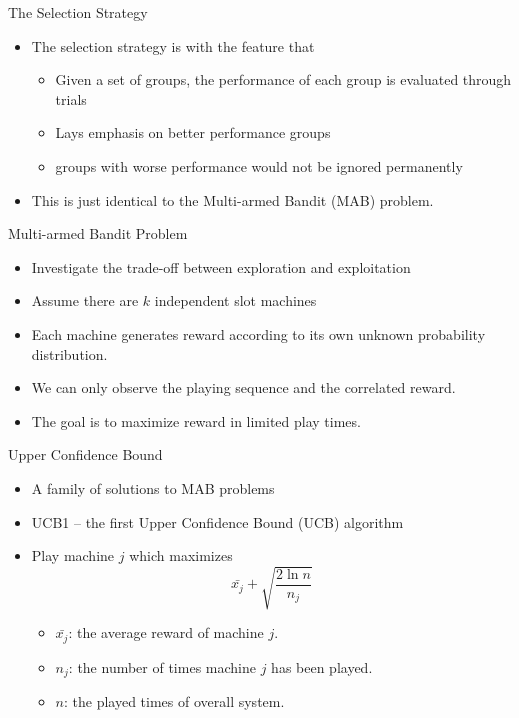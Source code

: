 \begin{frame}{The Selection Strategy}

  \begin{itemize}
    \item The selection strategy is with the feature that
      \begin{itemize}
        \item Given a set of groups, the performance of each group is
          evaluated through trials
        \item Lays emphasis on better performance groups
        \item groups with worse performance would not be ignored
          permanently
      \end{itemize}
      \vspace*{14pt}
    \item This is just identical to the Multi-armed Bandit (MAB)
      problem.
  \end{itemize}
\end{frame}

\begin{frame}{Multi-armed Bandit Problem}
  \begin{itemize}
    \item Investigate the trade-off between exploration and exploitation
      \vspace*{14pt}
    \item Assume there are $k$ independent slot machines
      \vspace*{14pt}
    \item Each machine generates reward according to its own unknown probability
      distribution.
      \vspace*{14pt}
    \item We can only observe the playing sequence and the correlated
      reward.
      \vspace*{14pt}
    \item The goal is to maximize reward in limited play times.
  \end{itemize}
\end{frame}

\begin{frame}{Upper Confidence Bound }
  \begin{itemize}
    \item A family of solutions to MAB problems
      \vspace*{14pt}
    \item UCB1 -- the first Upper Confidence Bound (UCB) algorithm
      \vspace*{14pt}
    \item Play machine $j$ which maximizes
      \[\bar{x_j} + \sqrt{\frac{2\ln n}{n_j}}\]
      \begin{itemize}
        \item $\bar{x_j}$: the average reward of machine $j$.
        \item $n_j$: the number of times machine $j$ has been played.
        \item $n$: the played times of overall system.
      \end{itemize} 
  \end{itemize}
\end{frame}

